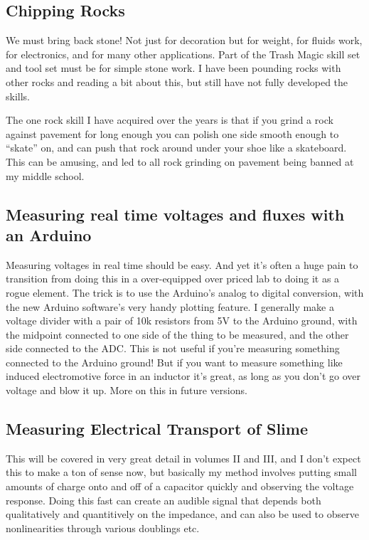 \subsection{Chipping Rocks}\label{chipping-rocks}

We must bring back stone! Not just for decoration but for weight, for
fluids work, for electronics, and for many other applications. Part of
the Trash Magic skill set and tool set must be for simple stone work. I
have been pounding rocks with other rocks and reading a bit about this,
but still have not fully developed the skills.

The one rock skill I have acquired over the years is that if you grind a
rock against pavement for long enough you can polish one side smooth
enough to ``skate'' on, and can push that rock around under your shoe
like a skateboard. This can be amusing, and led to all rock grinding on
pavement being banned at my middle school.

\subsection{Measuring real time voltages and fluxes with an
Arduino}\label{measuring-real-time-voltages-and-fluxes-with-an-arduino}

Measuring voltages in real time should be easy. And yet it's often a
huge pain to transition from doing this in a over-equipped over priced
lab to doing it as a rogue element. The trick is to use the Arduino's
analog to digital conversion, with the new Arduino software's very handy
plotting feature. I generally make a voltage divider with a pair of 10k
resistors from 5V to the Arduino ground, with the midpoint connected to
one side of the thing to be measured, and the other side connected to
the ADC. This is not useful if you're measuring something connected to
the Arduino ground! But if you want to measure something like induced
electromotive force in an inductor it's great, as long as you don't go
over voltage and blow it up. More on this in future versions.

\subsection{Measuring Electrical Transport of
Slime}\label{measuring-electrical-transport-of-slime}

This will be covered in very great detail in volumes II and III, and I
don't expect this to make a ton of sense now, but basically my method
involves putting small amounts of charge onto and off of a capacitor
quickly and observing the voltage response. Doing this fast can create
an audible signal that depends both qualitatively and quantitively on
the impedance, and can also be used to observe nonlinearities through
various doublings etc.

